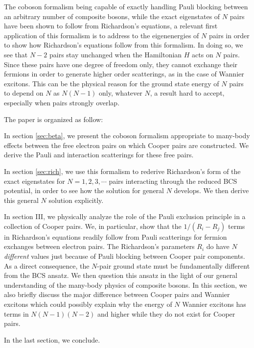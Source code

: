 \documentclass[aps,prb,superscriptaddress,showpacs,reprint,lengthcheck]{revtex4}
\begin{document}
The coboson formalism being capable of exactly handling Pauli blocking between an arbitrary number of composite bosons, while the exact eigenstates of $N$ pairs have been shown to follow from Richardson's equations, a relevant first application of this formalism  is to address to the eigenenergies of $N$ pairs in order to show how  Richardson's equations follow from this formalism. In doing so, we see that $N-2$ pairs stay unchanged when the Hamiltonian $H$ acts on $N$ pairs. Since these pairs have one degree of freedom only, they cannot exchange their fermions in order to generate higher order scatterings, as in the case of Wannier excitons. This can be the physical reason for the ground state energy of $N$ pairs to depend on $N$ as $N(N-1)$ only, whatever $N$, a result hard to accept, especially when pairs strongly overlap.


The paper is organized as follow:

In section \ref{sec:beta}, we present the coboson formalism appropriate to many-body effects between the free
electron pairs on which Cooper pairs are constructed. We derive the Pauli and interaction scatterings for these free pairs.

In section 
\ref{sec:rich}, we use this formalism to rederive Richardson's form of the
exact eigenstates for $N=1,2,3,\cdots$ pairs interacting through the reduced
BCS potential, in order to see how the solution for general $N$ develops. We then derive this general $N$ solution explicitly.

In section III,  we physically analyze the role of the Pauli exclusion principle in a collection of Cooper pairs. We, in particular, show that the $1/(R_i-R_j)$ terms in Richardson's equations readily follow
from Pauli scatterings for fermion exchanges 
between electron pairs. The Richardson's parameters $R_i$  do have $N$ \emph{different} values just because 
of Pauli blocking between Cooper pair components. As a direct consequence, the $N$-pair ground state must be fundamentally different from the BCS ansatz. We then question this ansatz in the light of our general understanding of the many-body physics of composite bosons. In this section, we also briefly discuss the major difference between Cooper pairs and Wannier excitons which could possibly explain why the energy of $N$ Wannier excitons has terms in $N(N-1)(N-2)$ and higher while they do not exist for Cooper pairs.

In the last section, we conclude.
\end{document}
